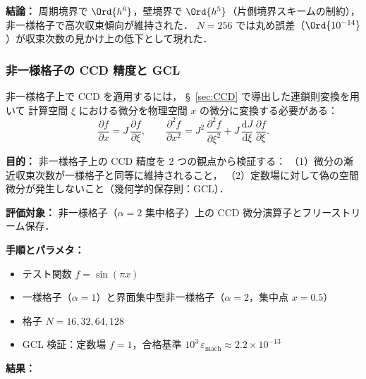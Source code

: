 \noindent\textbf{結論：}
周期境界で $\Ord{h^6}$，壁境界で $\Ord{h^5}$（片側境界スキームの制約），
非一様格子で高次収束傾向が維持された．
$N = 256$ では丸め誤差（$\Ord{10^{-14}}$）が収束次数の見かけ上の低下として現れた．

\subsubsection{非一様格子の CCD 精度と GCL}
\label{sec:gcl_verification}

非一様格子上で CCD を適用するには，
§~\ref{sec:CCD} で導出した連鎖則変換を用いて
計算空間 $\xi$ における微分を物理空間 $x$ の微分に変換する必要がある：
\begin{equation}
  \frac{\partial f}{\partial x} = J\,\frac{\partial f}{\partial\xi}, \qquad
  \frac{\partial^2 f}{\partial x^2}
    = J^2\,\frac{\partial^2 f}{\partial\xi^2}
      + J\,\frac{\mathrm{d}J}{\mathrm{d}\xi}\,\frac{\partial f}{\partial\xi}.
  \label{eq:gcl_chain}
\end{equation}

\noindent\textbf{目的：}
非一様格子上の CCD 精度を 2 つの観点から検証する：
（1）微分の漸近収束次数が一様格子と同等に維持されること，
（2）定数場に対して偽の空間微分が発生しないこと（幾何学的保存則：GCL）．

\noindent\textbf{評価対象：}
非一様格子（$\alpha=2$ 集中格子）上の CCD 微分演算子とフリーストリーム保存．

\noindent\textbf{手順とパラメタ：}
\begin{itemize}[noitemsep]
  \item テスト関数 $f = \sin(\pi x)$
  \item 一様格子（$\alpha=1$）と界面集中型非一様格子（$\alpha=2$，集中点 $x = 0.5$）
  \item 格子 $N = 16, 32, 64, 128$
  \item GCL 検証：定数場 $f = 1$，合格基準 $10^3\,\varepsilon_\mathrm{mach} \approx 2.2 \times 10^{-13}$
\end{itemize}

\noindent\textbf{結果：}

